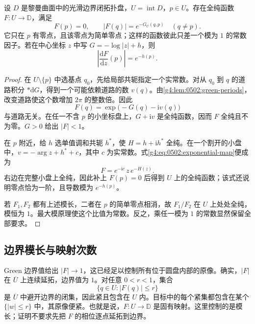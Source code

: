 \begin{proposition}
	\label{g4:prop:0502:green-map}
	设 \(D\) 是黎曼曲面中的光滑边界闭拓扑盘，\(U=\operatorname{int}D\)，\(p\in U\)。存在全纯函数 \(F:U\to\mathbb D\)，满足
	\[
		F(p)=0,\qquad |F(q)|=e^{-G_U(q,p)}\quad(q\ne p).
	\]
	它只在 \(p\) 有零点，且该零点为简单零点；这样的函数彼此只差一个模为 \(1\) 的常数因子。若在中心坐标 \(z\) 中写 \(G=-\log|z|+h\)，则
	\[
		\left|\frac{\mathrm{d}F}{\mathrm{d}z}(p)\right|=e^{-h(p)}.
	\]
\end{proposition}
\begin{proof}
	在 \(U\setminus\{p\}\) 中选基点 \(q_0\)，先给局部共轭指定一个实常数。对从 \(q_0\) 到 \(q\) 的道路积分 \(*\mathrm{d}G\)，得到一个可能依赖道路的数 \(v(q)\)。由\cref{g4:lem:0502:green-periods}，改变道路使这个数增加 \(2\pi\) 的整数倍。因此
	\begin{equation}
		\label{g4:eq:0502:exponential-map}
		F(q)=\exp\bigl(-G(q)-\mathrm{i}v(q)\bigr)
	\end{equation}
	与道路无关。在任一不含 \(p\) 的小坐标盘上，\(G+\mathrm{i}v\) 是全纯函数，因而 \(F\) 全纯且不为零。\(G>0\) 给出 \(|F|<1\)。

	在 \(p\) 附近，给 \(h\) 选单值调和共轭 \(h^*\)，使 \(H=h+\mathrm{i}h^*\) 全纯。在一个割开的小盘中，\(v=-\arg z+h^*+c\)，其中 \(c\) 为实常数。式\eqref{g4:eq:0502:exponential-map}便成为
	\[
		F=e^{-\mathrm{i}c}\,z\,e^{-H(z)}.
	\]
	右边在完整小盘上全纯，因此补上 \(F(p)=0\) 后得到 \(U\) 上的全纯函数；该式还说明零点恰为一阶，且导数模为 \(e^{-h(p)}\)。

	若 \(F_1,F_2\) 都有上述模长，二者在 \(p\) 的简单零点相消，故 \(F_1/F_2\) 在 \(U\) 上处处全纯，模恒为 \(1\)。最大模原理使这个比值为常数。反之，乘任一模为 \(1\) 的常数显然保留全部要求。
\end{proof}

\subsection{边界模长与映射次数}
\label{g4:subsec:0502:03}

Green 边界值给出 \(|F|\to1\)，这已经足以控制所有位于圆盘内部的原像。确实，\(|F|\) 在 \(\overline U\) 上连续延拓，边界值为 \(1\)。对任意 \(0<r<1\)，集合
\[
	\{q\in U:|F(q)|\le r\}
\]
是 \(\overline U\) 中避开边界的闭集，因此紧且包含在 \(U\) 内。目标中的每个紧集都包含在某个 \(\{|w|\le r\}\) 中，其原像便紧。也就是说，\(F:U\to\mathbb D\) 是固有映射。这里控制的是模长；证明不要求先把 \(F\) 的相位逐点延拓到边界。

\ProseParagraphBreak

